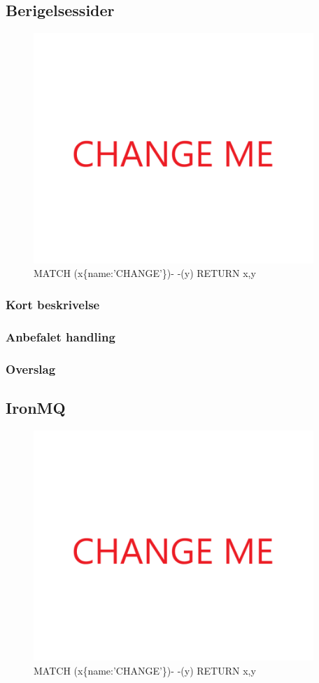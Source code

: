 \documentclass{article}
\begin{document}
\subsection{Berigelsessider}
\begin{figure}[h]
\includegraphics[width=300pt]{CHANGE.PNG}
\caption{MATCH (x\{name:'CHANGE'\})- -(y) RETURN x,y}
\end{figure}
\subsubsection{Kort beskrivelse}
\subsubsection{Anbefalet handling}
\subsubsection{Overslag}


\subsection{IronMQ}
\begin{figure}[h]
\includegraphics[width=300pt]{CHANGE.PNG}
\caption{MATCH (x\{name:'CHANGE'\})- -(y) RETURN x,y}
\end{figure}
\end{document}
